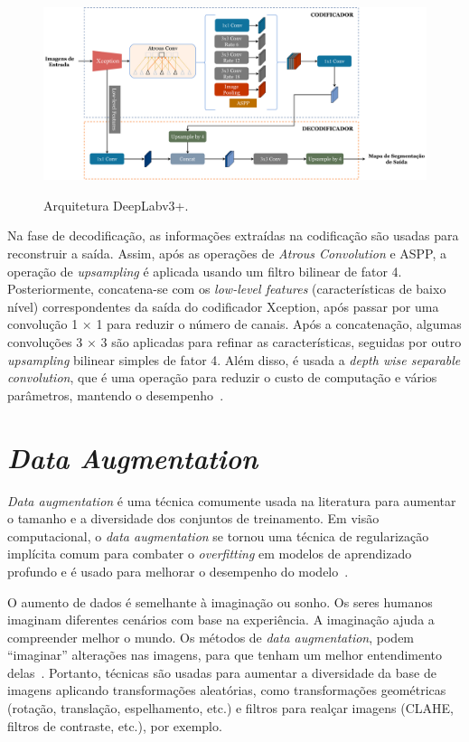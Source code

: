 \begin{figure}[!ht]
    \centering
    \caption{Arquitetura DeepLabv3+.}
    \includegraphics[width=1\textwidth]{figuras/arquitetura_DeepLabv3+.pdf}
    \label{fig:arquitetura_DeepLabv3+}
\end{figure}

Na fase de decodificação, as informações extraídas na codificação são usadas para reconstruir a saída. Assim, após as operações de \textit{Atrous Convolution} e ASPP, a operação de \textit{upsampling} é aplicada usando um filtro bilinear de fator 4. Posteriormente, concatena-se com os \textit{low-level features} (características de baixo nível) correspondentes da saída do codificador Xception, após passar por uma convolução 1 × 1 para reduzir o número de canais. Após a concatenação, algumas convoluções 3 × 3 são aplicadas para refinar as características, seguidas por outro \textit{upsampling} bilinear simples de fator 4. Além disso, é usada a \textit{depth wise separable convolution}, que é uma operação para reduzir o custo de computação e vários parâmetros, mantendo o desempenho~\cite{chen2018encoder}.

\section{\textit{Data Augmentation}}
\label{sec:data-augmentation}

\textit{Data augmentation} é uma técnica comumente usada na literatura para aumentar o tamanho e a diversidade dos conjuntos de treinamento. Em visão computacional, o \textit{data augmentation} se tornou uma técnica de regularização implícita comum para combater o \textit{overfitting} em modelos de aprendizado profundo e é usado para melhorar o desempenho do modelo~\cite{kukavcka2017regularization, mikolajczyk2018data}.

O aumento de dados é semelhante à imaginação ou sonho. Os seres humanos imaginam diferentes cenários com base na experiência. A imaginação ajuda a compreender melhor o mundo. Os métodos de \textit{data augmentation}, podem “imaginar” alterações nas imagens, para que tenham um melhor entendimento delas~\cite{shorten2019survey}. Portanto, técnicas são usadas para aumentar a diversidade da base de imagens aplicando transformações aleatórias, como transformações geométricas (rotação, translação, espelhamento, etc.) e filtros para realçar imagens (CLAHE, filtros de contraste, etc.), por exemplo.

